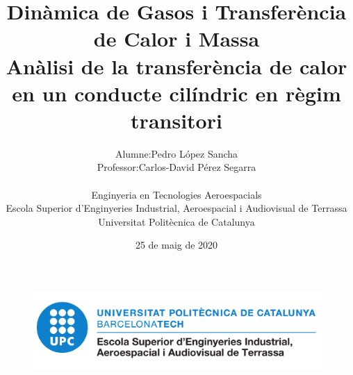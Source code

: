 
\title{
    \LARGE
    \textbf{Dinàmica de Gasos i Transferència de Calor i Massa}\\
    \textbf{\large{Anàlisi de la transferència de calor en un conducte cilíndric en règim transitori}}\\
}

\author{
    \begin{tabular}{rl}
    	\vspace{4mm}
        Alumne:    	& Pedro López Sancha 			\\ 
        Professor:  & Carlos-David Pérez Segarra 	
    \end{tabular}
    \vspace{1cm} \\
    Enginyeria en Tecnologies Aeroespacials \\
    \vspace{0.1cm}
    Escola Superior d'Enginyeries Industrial, Aeroespacial i Audiovisual de Terrassa \\
    \vspace{0.1cm}
    Universitat Politècnica de Catalunya\\
    \vspace{0.5cm} 
}

\date{25 de maig de 2020}

\begin{titlepage}
	\vspace*{\fill}
    \begin{center}
        \thetitle
        \vspace{1cm}
        \large{\theauthor}
        \thedate
    \end{center}
	\begin{figure}[ht]
		\centering
		\includegraphics[width=0.6\linewidth]{imagenes/00_general/logo_eseiaat.pdf}
	\end{figure}
    \vspace*{\fill}
\end{titlepage}


